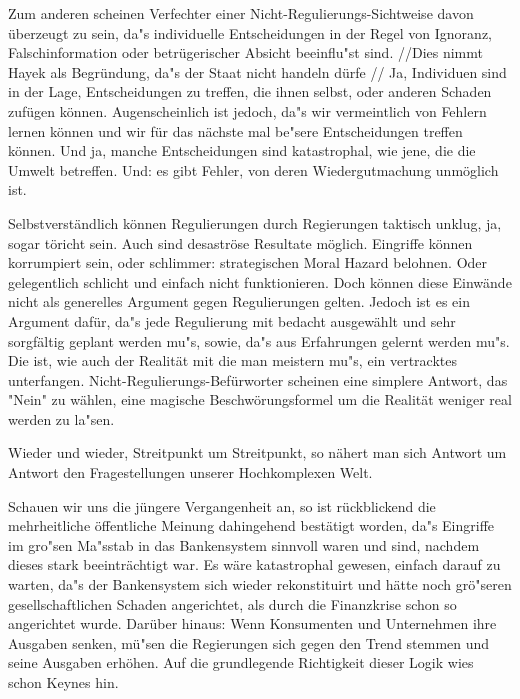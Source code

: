 \documentclass[
        onecolumn,
        a4paper,
        abstracton,
        parskip=half
        ,final
        ]{scrartcl}
\begin{document}
Zum anderen scheinen Verfechter einer Nicht-Regulierungs-Sichtweise davon {\"u}berzeugt zu sein, da{"s} individuelle Entscheidungen in der Regel von Ignoranz, Falschinformation oder betr{\"u}gerischer Absicht beeinflu{"s}t sind. //Dies nimmt Hayek als Begr{\"u}ndung, da{"s} der Staat nicht handeln d{\"u}rfe //
Ja, Individuen sind in der Lage, Entscheidungen zu treffen, die ihnen selbst, oder anderen Schaden zuf{\"u}gen k{\"o}nnen. Augenscheinlich ist jedoch, da{"s} wir vermeintlich von Fehlern lernen k{\"o}nnen und wir f{\"u}r das n{\"a}chste mal be{"s}ere Entscheidungen treffen k{\"o}nnen. Und ja, manche Entscheidungen sind katastrophal, wie jene, die die Umwelt betreffen. Und: es gibt Fehler, von deren Wiedergutmachung unm{\"o}glich ist.

Selbstverst{\"a}ndlich k{\"o}nnen Regulierungen durch Regierungen taktisch unklug, ja, sogar t{\"o}richt sein. Auch sind desastr{\"o}se Resultate m{\"o}glich. Eingriffe k{\"o}nnen korrumpiert sein, oder schlimmer: strategischen Moral Hazard belohnen. Oder gelegentlich schlicht und einfach nicht funktionieren. Doch k{\"o}nnen diese Einw{\"a}nde nicht als generelles Argument gegen Regulierungen gelten. Jedoch ist es ein Argument daf{\"u}r, da{"s} jede Regulierung mit bedacht ausgew{\"a}hlt und sehr sorgf{\"a}ltig geplant werden mu{"s}, sowie, da{"s} aus Erfahrungen gelernt werden mu{"s}. Die ist, wie auch der Realit{\"a}t mit die man meistern mu{"s}, ein vertracktes unterfangen. Nicht-Regulierungs-Bef{\"u}rworter scheinen eine simplere Antwort, das "Nein" zu w{\"a}hlen, eine magische Beschw{\"o}rungsformel um die Realit{\"a}t weniger real werden zu la{"s}en.

Wieder und wieder, Streitpunkt um Streitpunkt, so n{\"a}hert man sich Antwort um Antwort den Fragestellungen unserer Hochkomplexen Welt.

Schauen wir uns die j{\"u}ngere Vergangenheit an, so ist r{\"u}ckblickend die mehrheitliche {\"o}ffentliche Meinung dahingehend best{\"a}tigt worden, da{"s} Eingriffe im gro{"s}en Ma{"s}stab in das Bankensystem sinnvoll waren und sind, nachdem dieses stark beeintr{\"a}chtigt war. Es w{\"a}re katastrophal gewesen, einfach darauf zu warten, da{"s} der Bankensystem sich wieder rekonstituirt und h{\"a}tte noch gr{\"o}{"s}eren gesellschaftlichen Schaden angerichtet, als durch die Finanzkrise schon so angerichtet wurde. Dar{\"u}ber hinaus: Wenn Konsumenten und Unternehmen ihre Ausgaben senken, m{\"u}{"s}en die Regierungen sich gegen den Trend stemmen und seine Ausgaben erh{\"o}hen. Auf die grundlegende Richtigkeit dieser Logik wies schon Keynes hin.
\end{document}
